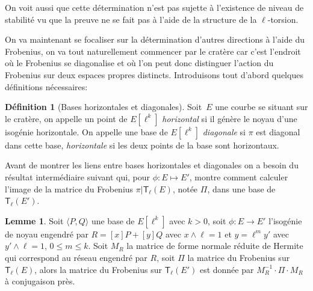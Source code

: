 \documentclass[10pt,a4paper]{book}
\theoremstyle{plain}
\theoremstyle{definition}
\newtheorem{lem}[thm]{Lemme}
\theoremstyle{definition}
\theoremstyle{definition}
\theoremstyle{definition}
\newtheorem{defi}[thm]{Définition}
\theoremstyle{remark}
\theoremstyle{remark}
\theoremstyle{definition}
\begin{document}
On voit aussi que cette détermination n'est pas sujette à l'existence de niveau
de stabilité vu que la preuve ne se fait pas à l'aide de la structure de la 
$\ell$-torsion.

On va maintenant se focaliser sur la détermination d'autres directions à l'aide
du Frobenius, on va tout naturellement commencer par le cratère car c'est 
l'endroit où le Frobenius se diagonalise et où l'on peut donc distinguer 
l'action du Frobenius sur deux espaces propres distincts. Introduisons tout 
d'abord quelques définitions nécessaires:


\begin{defi}[Bases horizontales et diagonales]
  Soit~$E$ une courbe se situant sur le cratère, 
  on appelle un point de $E[\ell^k]$ \emph{horizontal} 
  si il génère le noyau d'une isogénie horizontale. 
  On appelle une base de $E[\ell^k]$ \emph{diagonale} 
  si $\pi$ est diagonal dans cette base, \emph{horizontale} si 
  les deux points de la base sont horizontaux.
\end{defi}

Avant de montrer les liens entre bases horizontales et diagonales on a besoin du résultat intermédiaire suivant qui, pour $\phi:E \mapsto E'$, montre comment calculer l'image de la matrice du Frobenius $\pi|\mathsf{T}_{\ell}(E)$, notée $\Pi$, dans une base de $\mathsf{T}_{\ell}(E')$.

\begin{lem}
\label{lem:iso:con}
Soit $\langle P, Q \rangle$ une base de $E[\ell^k]$ avec $k>0$, soit $\phi:E 
\rightarrow E'$ l'isogénie de noyau engendré par $R=[x]P+[y]Q$  avec $x\wedge 
\ell =1$ et $y=\ell^my'$ avec $y' \wedge \ell =1$, $0 \leqslant m \leqslant k$.
Soit $M_R$ la matrice de forme normale réduite de Hermite qui correspond au réseau 
 engendré par $R$, soit $\Pi$ la matrice du Frobenius sur $\mathsf{T}_{\ell}(E)$, alors la 
matrice du Frobenius sur $\mathsf{T}_{\ell}(E')$ est donnée par $M_R^{-1} \cdot \Pi 
\cdot M_R$ à conjugaison près.
\end{lem}
\end{document}
